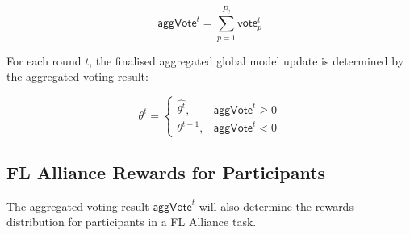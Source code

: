 \documentclass[conference]{IEEEtran}
\newcommand{\FL}{\ac{FL} Alliance\xspace}
\begin{document}
\begin{itemize}
\begin{equation*}
  \mathsf{aggVote}^t= \sum_{p = 1}^{ P_v}  \mathsf{vote}_p^t
\end{equation*}

For each round $t$, the finalised aggregated global model update is determined by the aggregated voting result:

\begin{equation*}
  \theta^t =
    \begin{cases}
      \hat{\theta^t}, & \mathsf{aggVote}^t \geq 0 \\
      \theta^{t-1}, & \mathsf{aggVote}^t < 0
    \end{cases} 
\end{equation*}


\end{itemize}



\subsection{\FL Rewards for Participants} The aggregated voting result $\mathsf{aggVote}^t$ will also determine the rewards distribution for participants in a \FL task.





\end{document}
